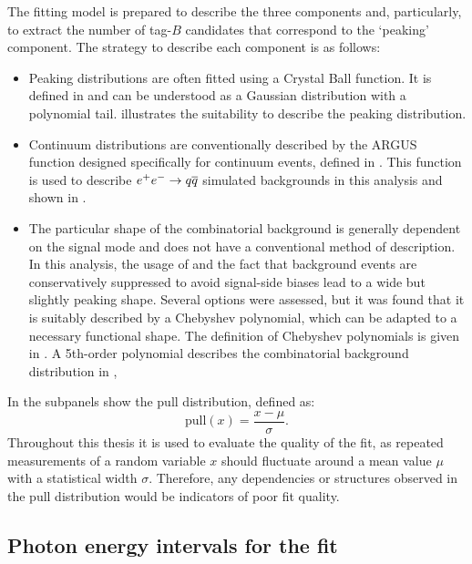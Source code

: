 The fitting model is prepared to describe the three components and, particularly, to extract the number of tag-$B$ candidates that correspond to the `peaking' component.
The strategy to describe each component is as follows:
\begin{itemize}
    \item Peaking \Mbc distributions are often fitted using a Crystal Ball function.
    It is defined in  and can be understood as a Gaussian distribution with a polynomial tail.
     illustrates the suitability to describe the peaking \Mbc distribution.
    \item Continuum \Mbc distributions are conventionally described by the ARGUS function designed specifically for continuum events, defined in .
    This function is used to describe $e^+e^-\rightarrow q\overline q$ simulated backgrounds in this analysis and shown in .
    \item The particular shape of the combinatorial \BB background is generally dependent on the signal mode and does not have a conventional method of description.
    In this analysis, the usage of \FEI and the fact that background events are conservatively suppressed to avoid signal-side biases lead to a wide but slightly peaking shape.
    Several options were assessed, but it was found that it is suitably described by a Chebyshev polynomial, which can be adapted to a necessary functional shape.
    The definition of Chebyshev polynomials is given in .
    A 5th-order polynomial describes the combinatorial \BB background distribution in ,
\end{itemize}
In  the subpanels show the pull distribution, defined as:
\begin{equation}\label{eq:pull_distribution}
    \mathrm{pull}(x) = \frac{x-\mu}{\sigma}. 
\end{equation}
Throughout this thesis it is used to evaluate the quality of the fit, as repeated measurements of a random variable $x$ should fluctuate around a mean value $\mu$ with a statistical width $\sigma$.
Therefore, any dependencies or structures observed in the pull distribution would be indicators of poor fit quality. 

\subsection{Photon energy intervals for the fit}\label{sec:binning}

